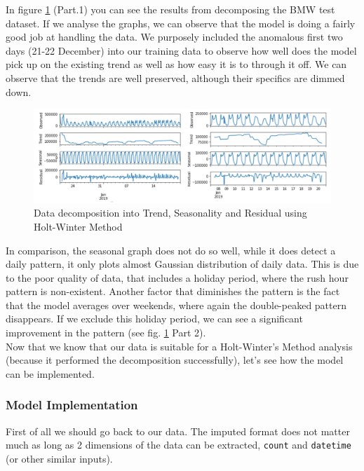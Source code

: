 In figure \ref{fig:holt_winter_decomposition} (Part.1) you can see the results from decomposing the BMW test dataset. If we analyse the graphs, we can observe that the model is doing a fairly good job at handling the data. We purposely included the anomalous first two days (21-22 December) into our training data to observe how well does the model pick up on the existing trend as well as how easy it is to through it off. We can observe that the trends are well preserved, although their specifics are dimmed down.\\
\begin{figure}[h]
    \includegraphics[width=1\textwidth]{images/holt-winter-decomposition.png}
    \caption{Data decomposition into Trend, Seasonality and Residual using Holt-Winter Method }
    \label{fig:holt_winter_decomposition}
\end{figure}
In comparison, the seasonal graph does not do so well, while it does detect a daily pattern, it only plots almost Gaussian distribution of daily data. This is due to the poor quality of data, that includes a holiday period, where the rush hour pattern is non-existent. Another factor that diminishes the pattern is the fact that the model averages over weekends, where again the double-peaked pattern disappears. If we exclude this holiday period, we can see a significant improvement in the pattern (see fig. \ref{fig:holt_winter_decomposition} Part 2).\\

Now that we know that our data is suitable for a Holt-Winter's Method analysis (because it performed the decomposition successfully), let's see how the model can be implemented.

\subsubsection{Model Implementation}
First of all we should go back to our data. The imputed format does not matter much as long as 2 dimensions of the data can be extracted, \verb|count| and \verb|datetime| (or other similar inputs).

